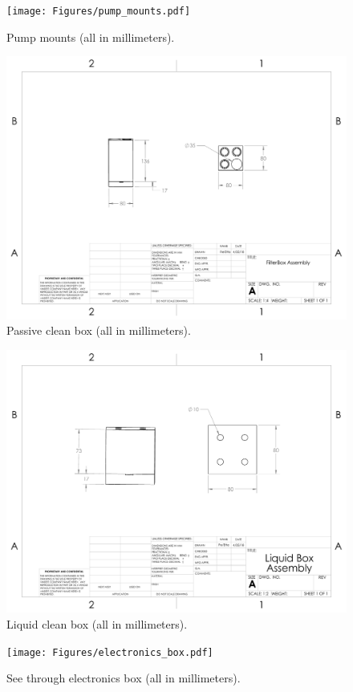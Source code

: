 \begin{centering}
  \newpage
  
  \begin{figure}[h]
    \texttt{[image: Figures/pump\_mounts.pdf]}
    \caption{Pump mounts (all in millimeters).}
    \label{fig:PumpMounts}
  \end{figure}
  
  \newpage
  
  \begin{figure}[h]
    \includegraphics[width=\textwidth]{Figures/filter_box_assembly.pdf}
    \caption{Passive clean box (all in millimeters).}
    \label{fig:FilterBox}
  \end{figure}
  
  \newpage
  
  \begin{figure}[h]
    \includegraphics[width=\textwidth]{Figures/liquid_box_assembly.pdf}
    \caption{Liquid clean box (all in millimeters).}
    \label{fig:LiquidBox}
  \end{figure}
  
  \newpage
  
  \begin{figure}[h]
    \texttt{[image: Figures/electronics\_box.pdf]}
    \caption{See through electronics box (all in millimeters).}
    \label{fig:ElectronicsBox}
  \end{figure}
\end{centering}

